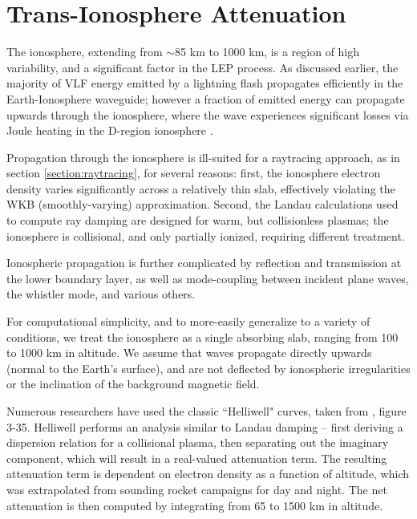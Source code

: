 \section{Trans-Ionosphere Attenuation}
\label{section:trans_ionosphere_atten}
The ionosphere, extending from $\sim$85 km to 1000 km, is a region of high variability, and a significant factor in the LEP process. As discussed earlier, the majority of VLF energy emitted by a lightning flash propagates efficiently in the Earth-Ionosphere waveguide; however a fraction of emitted energy can propagate upwards through the ionosphere, where the wave experiences significant losses via Joule heating in the D-region ionosphere \citep{Graf2013, Blaes2016}.

Propagation through the ionosphere is ill-suited for a raytracing approach, as in section \ref{section:raytracing}, for several reasons: first, the ionosphere electron density varies significantly across a relatively thin slab, effectively violating the WKB (smoothly-varying) approximation. Second, the Landau calculations used to compute ray damping are designed for warm, but collisionless plasmas; the ionosphere is collisional, and only partially ionized, requiring different treatment.

Ionospheric propagation is further complicated by reflection and transmission at the lower boundary layer, as well as mode-coupling between incident plane waves, the whistler mode, and various others. 

For computational simplicity, and to more-easily generalize to a variety of conditions, we treat the ionosphere as a single absorbing slab, ranging from 100 to 1000 km in altitude. We assume that waves propagate directly upwards (normal to the Earth's surface), and are not deflected by ionospheric irregularities or the inclination of the background magnetic field.

Numerous researchers \citep{Lauben1998, Bortnik2005, Kulkarni2009, Graf2013} have used the classic ``Helliwell" curves, taken from \cite{Helliwell1965}, figure 3-35. Helliwell performs an analysis similar to Landau damping -- first deriving a dispersion relation for a collisional plasma, then separating out the imaginary component, which will result in a real-valued attenuation term. The resulting attenuation term is dependent on electron density as a function of altitude, which was extrapolated from sounding rocket campaigns for day and night. The net attenuation is then computed by integrating from 65 to 1500 km in altitude.

